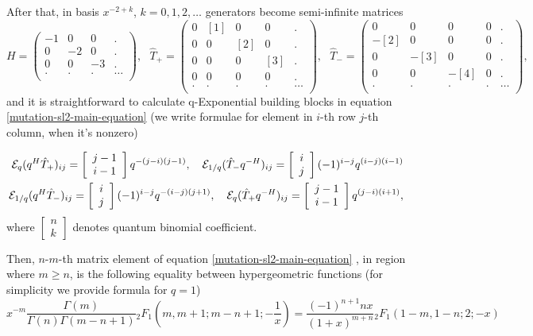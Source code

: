 \documentclass{article}
\newcommand{\lb}{\left (}
\newcommand{\rb}{\right )}
\newcommand{\lsb}{\left [}
\newcommand{\rsb}{\right ]}
\newcommand {\?}{\textit{???}}
\newcommand{\me}[0]{\mathcal{E}}
\newcommand{\hT}[0]{\hat{T}}
\begin{document}
After that, in basis $x^{-2 + k}$, $k = 0, 1, 2, \dots$ generators become semi-infinite matrices
\begin{equation}
H = \lb \begin{array}{cccc}
  -1 & 0 & 0 & . \\
  0 & -2 & 0 & . \\
  0 & 0 & -3 & . \\
  . & . & . & \dots \\
\end{array}\rb,\ \ \ 
\hT_+ = \lb \begin{array}{ccccc}
  0 & [1] & 0 & 0 & . \\
  0 & 0 & [2] & 0 & . \\
  0 & 0 & 0 & [3] & . \\
  0 & 0 & 0 & 0 & . \\
  . & . & . & . & \dots \\
\end{array}\rb,\ \ \ 
\hT_- = \lb \begin{array}{ccccc}
  0 & 0 & 0 & 0 & . \\
  -[2] & 0 & 0 & 0 & . \\
  0 & -[3] & 0 & 0 & . \\
  0 & 0 & -[4] & 0 & . \\
  . & . & . & . & \dots \\
\end{array}\rb,\ \ \ 
\end{equation}
and it is straightforward to calculate q-Exponential building blocks in equation \eqref{mutation-sl2-main-equation}
(we write formulae for element in $i$-th row $j$-th column, when it's nonzero)

\newcommand{\qbin}[2]{\lsb \begin{array}{c} #1 \\ #2 \end{array} \rsb}

\begin{align}
\me_q(q^H \hT_+)_{ij} = \qbin{j - 1}{i - 1} q^{-(j-i)(j-1)},\ \ \
\me_{1/q}(\hT_- q^{-H})_{ij} = \qbin{i}{j} (-1)^{i - j} q^{(i-j)(i-1)} \\ \notag
\me_{1/q}(q^H \hT_-)_{ij} = \qbin{i}{j} (-1)^{i-j} q^{-(i-j)(j+1)},\ \ \
\me_{q}(\hT_+ q^{-H})_{ij} = \qbin{j-1}{i-1} q^{(j-i)(i+1)},
\end{align}
where $\qbin{n}{k}$ denotes quantum binomial coefficient.

Then, $n$-$m$-th matrix element of equation \eqref{mutation-sl2-main-equation}
, in region where $m \geq n$,
is the following equality between hypergeometric functions (for simplicity we provide formula for $q = 1$)
\begin{equation}
\label{eq:mutation-equation-sl2-corollary}
x^{-m} \frac{\Gamma(m)}{\Gamma(n) \Gamma(m - n + 1)} {_2F_1} \lb m, m+1 ; m - n + 1; -\frac{1}{x}\rb
= \frac{(-1)^{n+1} n x}{(1 + x)^{m + n}} {_2F_1} \lb 1-m, 1-n ; 2; -x \rb
\end{equation}
\end{document}
